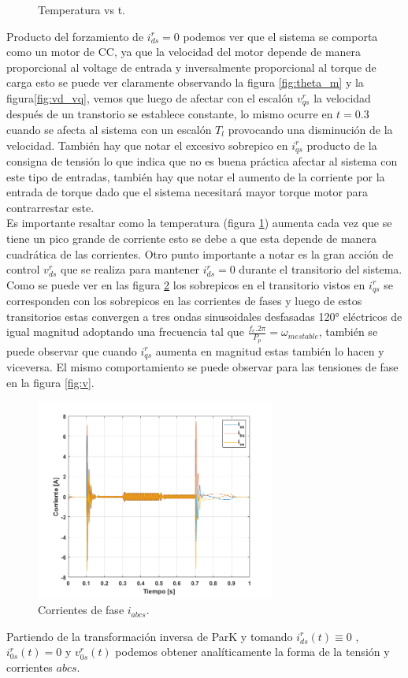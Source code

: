 \documentclass[10pt]{article}
\begin{document}
\begin{itemize}
\begin{figure}[h!]
	\caption{\label{fig:temperatura} Temperatura vs t.}
	\end{figure}
	Producto del forzamiento de $i^{r}_{ds}=0$ podemos ver que el sistema se comporta como un motor de CC, ya que la velocidad del motor depende de manera proporcional al voltage de entrada y inversalmente proporcional al torque de carga esto se puede ver claramente observando la figura \ref{fig:theta_m} y la figura\ref{fig:vd_vq}, vemos que luego de afectar con el escalón $v^{r}_{qs}$ la velocidad después de un transtorio se establece constante, lo mismo ocurre en $t=0.3$ cuando se afecta al sistema con un escalón $T_{l}$ provocando una disminución de la velocidad. También hay que notar el excesivo sobrepico en $i^{r}_{qs}$ producto de la consigna de tensión lo que indica que no es buena práctica afectar al sistema con este tipo de entradas, también hay que notar el aumento de la corriente por la entrada de torque dado que el sistema necesitará mayor torque motor para contrarrestar este. \\
	Es importante resaltar como la temperatura (figura \ref{fig:temperatura}) aumenta cada vez que se tiene un pico grande de corriente esto se debe a que esta depende de manera cuadrática de las corrientes.
	Otro punto importante a notar es la gran acción de control $v^{r}_{ds}$ que se realiza para mantener $i^{r}_{ds}=0$ durante el transitorio del sistema.
	 Como se puede ver en las figura \ref{fig:corriente} los sobrepicos en el transitorio vistos en $i^{r}_{qs}$ se corresponden con los sobrepicos en las corrientes de fases y luego de estos transitorios estas convergen a tres ondas sinusoidales desfasadas 120° eléctricos de igual magnitud adoptando una frecuencia tal que $\frac{f_{e}.2\pi}{P_{p}}=\omega_{mestable}$, también se puede observar que cuando $i^{r}_{qs}$ aumenta en magnitud estas también lo hacen y viceversa. El mismo comportamiento se puede observar para las tensiones de fase en la figura \ref{fig:v}.
	\begin{figure}[h!]
	\centering
	\includegraphics[width=0.7\textwidth]{corriente.png}
	\caption{\label{fig:corriente} Corrientes de fase $i_{abcs}$.}
	\end{figure}
	Partiendo de la transformación inversa de ParK y tomando $i^{r}_{ds}(t) \equiv 0$ , $i^{r}_{0s}(t)=0$ y $v^{r}_{0s}(t)$ podemos obtener analíticamente la forma de la tensión y corrientes $abcs$.\\
	

\end{itemize}
\end{document}
